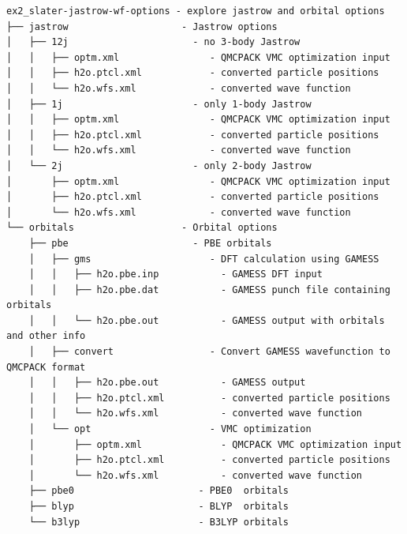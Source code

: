 \begin{shaded}
\begin{verbatim}
ex2_slater-jastrow-wf-options - explore jastrow and orbital options
├── jastrow                    - Jastrow options
│   ├── 12j                      - no 3-body Jastrow
│   │   ├── optm.xml                - QMCPACK VMC optimization input
│   │   ├── h2o.ptcl.xml            - converted particle positions
│   │   └── h2o.wfs.xml             - converted wave function 
│   ├── 1j                       - only 1-body Jastrow
│   │   ├── optm.xml                - QMCPACK VMC optimization input
│   │   ├── h2o.ptcl.xml            - converted particle positions
│   │   └── h2o.wfs.xml             - converted wave function 
│   └── 2j                       - only 2-body Jastrow
│       ├── optm.xml                - QMCPACK VMC optimization input
│       ├── h2o.ptcl.xml            - converted particle positions
│       └── h2o.wfs.xml             - converted wave function 
└── orbitals                   - Orbital options
    ├── pbe                      - PBE orbitals
    │   ├── gms                     - DFT calculation using GAMESS
    │   │   ├── h2o.pbe.inp           - GAMESS DFT input
    │   │   ├── h2o.pbe.dat           - GAMESS punch file containing orbitals
    │   │   └── h2o.pbe.out           - GAMESS output with orbitals and other info
    │   ├── convert                 - Convert GAMESS wavefunction to QMCPACK format
    │   │   ├── h2o.pbe.out           - GAMESS output
    │   │   ├── h2o.ptcl.xml          - converted particle positions
    │   │   └── h2o.wfs.xml           - converted wave function
    │   └── opt                     - VMC optimization
    │       ├── optm.xml              - QMCPACK VMC optimization input
    │       ├── h2o.ptcl.xml          - converted particle positions
    │       └── h2o.wfs.xml           - converted wave function 
    ├── pbe0                      - PBE0  orbitals
    ├── blyp                      - BLYP  orbitals
    └── b3lyp                     - B3LYP orbitals
    

\end{verbatim}
\end{shaded}
